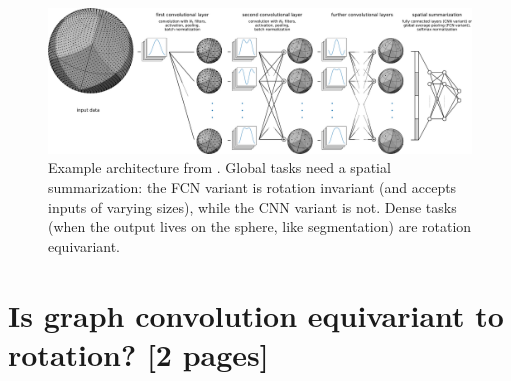 \documentclass{article} %
\renewcommand{\b}[1]{{\bm{#1}}}   %
\newcommand{\nati}[1]{{\color[rgb]{.3,.5,.9}{#1}}}
\begin{document}
\begin{figure}
	\centering
	\includegraphics[width=0.9\linewidth]{figure_architecture_v3}
	\caption{Example architecture from \cite{perraudin2019deepsphere}.
		Global tasks need a spatial summarization: the FCN variant is rotation invariant (and accepts inputs of varying sizes), while the CNN variant is not.
		Dense tasks (when the output lives on the sphere, like segmentation) are rotation equivariant.
	}
	\label{fig:architecture}
\end{figure}


\section{Is graph convolution equivariant to rotation? [2 pages]}

\end{document}
